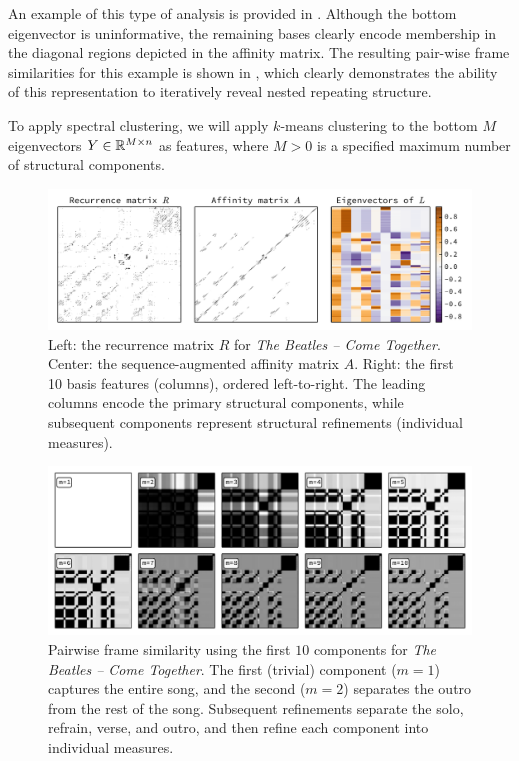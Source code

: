 \documentclass{article}
\begin{document}
An example of this type of analysis is provided in .  Although the
bottom eigenvector is uninformative, the remaining bases clearly encode membership in
the diagonal regions depicted in the affinity matrix.  The resulting pair-wise frame
similarities for this example is shown in , which clearly demonstrates
the ability of this representation to iteratively reveal nested repeating structure.

To apply spectral clustering, we will apply $k$-means clustering to the bottom $M$ 
eigenvectors $Y \in \mathbb{R}^{M \times n}$ as features, where $M > 0$ is a specified maximum 
number of structural components.

\begin{figure}
\centering
\includegraphics[width=\textwidth]{figs/recurrence}
\caption{Left: the recurrence matrix $R$ for \emph{The Beatles -- Come
Together}. Center: the sequence-augmented affinity matrix $A$.
Right: the first 10 basis features (columns), ordered left-to-right.  
The leading columns encode the primary structural components, while subsequent components represent structural refinements (individual measures).\label{recurrence}}
\end{figure}

 
\begin{figure}
\centering
\includegraphics[width=\textwidth]{figs/lowrank}
\caption{Pairwise frame similarity using the first $10$ components for \emph{The Beatles -- Come Together}.  The first
(trivial) component ($m=1$) captures the entire song, and the second ($m=2$) separates
the outro from the rest of the song.  Subsequent refinements separate the solo,
refrain, verse, and outro, and then refine each component into individual measures.\label{lowrank}}
\end{figure}
\end{document}
